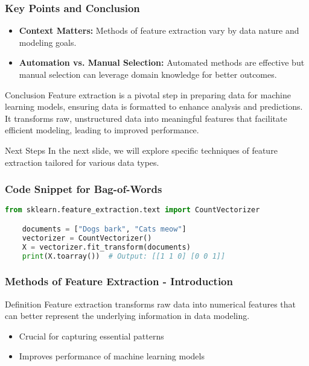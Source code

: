 \documentclass[aspectratio=169]{beamer}
\begin{document}
\begin{frame}[fragile]
    \frametitle{Key Points and Conclusion}
    \begin{itemize}
        \item \textbf{Context Matters:} Methods of feature extraction vary by data nature and modeling goals.
        \item \textbf{Automation vs. Manual Selection:} Automated methods are effective but manual selection can leverage domain knowledge for better outcomes.
    \end{itemize}
    
    \begin{block}{Conclusion}
        Feature extraction is a pivotal step in preparing data for machine learning models, ensuring data is formatted to enhance analysis and predictions. It transforms raw, unstructured data into meaningful features that facilitate efficient modeling, leading to improved performance.
    \end{block}
    
    \begin{block}{Next Steps}
        In the next slide, we will explore specific techniques of feature extraction tailored for various data types.
    \end{block}
\end{frame}

\begin{frame}[fragile]
    \frametitle{Code Snippet for Bag-of-Words}
    \begin{lstlisting}[language=Python]
    from sklearn.feature_extraction.text import CountVectorizer

    documents = ["Dogs bark", "Cats meow"]
    vectorizer = CountVectorizer()
    X = vectorizer.fit_transform(documents)
    print(X.toarray())  # Output: [[1 1 0] [0 0 1]]
    \end{lstlisting}
\end{frame}

\begin{frame}[fragile]
    \frametitle{Methods of Feature Extraction - Introduction}
    \begin{block}{Definition}
        Feature extraction transforms raw data into numerical features that can better represent the underlying information in data modeling.
    \end{block}
    
    \begin{itemize}
        \item Crucial for capturing essential patterns
        \item Improves performance of machine learning models
    \end{itemize}
\end{frame}
\end{document}
